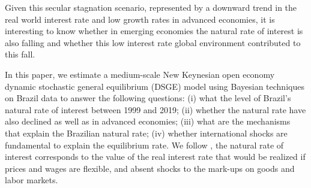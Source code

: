 \documentclass[12pt,oneside,a4paper]{article}
\begin{document}

Given this secular stagnation scenario, represented by a downward trend in the real world interest rate and low growth rates in advanced economies, it is interesting to know whether in emerging economies the natural rate of interest  is also falling and whether this low interest rate global environment contributed to this fall. 

In this paper, we estimate a medium-scale New Keynesian open economy dynamic stochastic general equilibrium (DSGE) model using Bayesian techniques on Brazil data to answer the following questions: (i) what the level of Brazil's natural rate of interest  between 1999 and 2019; (ii) whether the natural rate have also declined as well as in advanced economies; (iii) what are the mechanisms that explain the Brazilian natural rate; (iv) whether international shocks are fundamental to explain the equilibrium rate. We follow \citet{Woodford:2003}, the natural rate of interest corresponds to the value of the real interest rate that would be realized if prices and wages are flexible, and absent shocks to the mark-ups on goods and labor markets.



\end{document}
